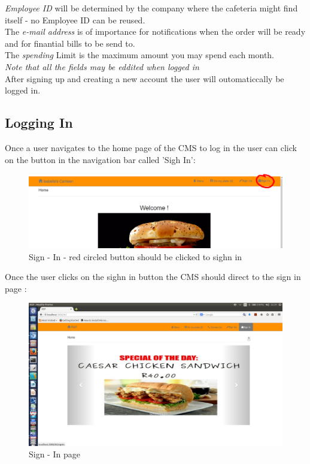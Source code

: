 \documentclass[a4paper,12pt]{article}
\begin{document}
{\em Employee ID } will be determined by the company where the cafeteria might find itself - no Employee ID can be reused.\\
The {\em e-mail address} is of importance for notifications when the order will be ready and for finantial bills to be send to. \\
The {\em spending} Limit is the maximum amount you may spend each month.\\

{\em Note that all the fields may be eddited when logged in} \\

After signing up and creating a new account the user will outomaticcally be logged in. \\

\subsection{Logging In}
Once a user navigates to the home page of the CMS to log in the user can click on the button in the navigation bar called 'Sigh In':

\begin{figure}[H]
  \centering
    \includegraphics[width=1.0\textwidth]{screenshots/sighnIn.png}
    \caption{Sign - In - red circled button should be clicked to sighn in} 
\end{figure}

Once the user clicks on the sighn in button the CMS should direct to the sign in page :

\begin{figure}[H]
  \centering
    \includegraphics[width=1.0\textwidth]{screenshots/signIn.png}
    \caption{Sign - In page} 
\end{figure}
\end{document}
